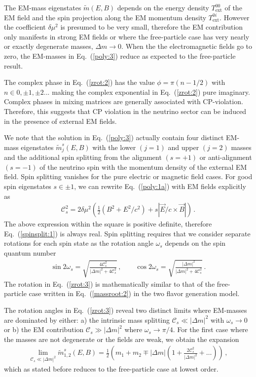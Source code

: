 \documentclass[addchapnum]{ws-rv961x669} %
\newcommand{\req}[1]{Eq.~(\ref{#1})}
\begin{document}
The EM-mass eigenstates $\widetilde m(E,B)$ depends on the energy density $T_\mathrm{ext}^{00}$ of the EM field and the spin projection along the EM momentum density $T_\mathrm{ext}^{0i}$. However the coefficient $\delta\mu^{2}$ is presumed to be very small, therefore the EM contribution only manifests in strong EM fields or where the free-particle case has very nearly or exactly degenerate masses, $\Delta m\to 0$. When the the electromagnetic fields go to zero, the EM-masses in \req{poly:3} reduce as expected to the free-particle result.

The complex phase in \req{zrot:2} has the value $\phi=\pi(n-1/2)$ with $n\in0,\pm1,\pm2...$ making the complex exponential in \req{zrot:2} pure imaginary. Complex phases in mixing matrices are generally associated with CP-violation. Therefore, this suggests that CP violation in the neutrino sector can be induced in the presence of external EM fields.

We note that the solution in \req{poly:3} actually contain four distinct EM-mass eigenstates $\widetilde m_{j}^{s}(E,B)$ with the lower $(j=1)$ and upper $(j=2)$ masses and the additional spin splitting from the alignment $(s=+1)$ or anti-alignment $(s=-1)$ of the neutrino spin with the momentum density of the external EM field. Spin splitting vanishes for the pure electric or magnetic field cases. For good spin eigenstates $s\in\pm1$, we can rewrite \req{poly:1a} with EM fields explicitly as
\begin{align}
\label{spinsplit:1}
\mathcal{C}^{2}_{s}=2\delta\mu^{2}\left(\frac{1}{2}(B^{2}+E^{2}/c^{2})+s|\vec{E}/c\times\vec{B}|\right)\,.
\end{align}
The above expression within the square is positive definite, therefore \req{spinsplit:1} is always real. Spin splitting requires that we consider separate rotations for each spin state as the rotation angle $\omega_{s}$ depends on the spin quantum number
\begin{align}
\label{zrot:3}
\sin2\omega_{s}=\sqrt{\frac{4\mathcal{C}_{s}^{2}}{|\Delta m|^{2}+4\mathcal{C}_{s}^{2}}}\,,\qquad
\cos2\omega_{s}=\sqrt{\frac{|\Delta m|^{2}}{|\Delta m|^{2}+4\mathcal{C}_{s}^{2}}}\,.
\end{align}
The rotation in \req{zrot:3} is mathematically similar to that of the free-particle case written in \req{massroot:2} in the two flavor generation model.

The rotation angles in \req{zrot:3} reveal two distinct limits where EM-masses are dominated by either: a) the intrinsic mass splitting $\mathcal{C}_{s}\ll|\Delta m|^{2}$ with $\omega_{s}\rightarrow0$ or b) the EM contribution $\mathcal{C}_{s}\gg|\Delta m|^{2}$ where $\omega_{s}\rightarrow\pi/4$.
For the first case where the masses are not degenerate or the fields are weak, we obtain the expansion
\begin{align}
\label{series:1}
\lim_{\mathcal{C}_{s}\ll|\Delta m|^{2}}\widetilde m_{1,2}^{s}(E,B)=\frac{1}{2}\left(m_{1}+m_{2}\mp|\Delta m|\left(1+\frac{2\mathcal{C}_{s}^{2}}{|\Delta m|^{2}}+\ldots\right)\right)\,,
\end{align}
which as stated before reduces to the free-particle case at lowest order.
\end{document}
